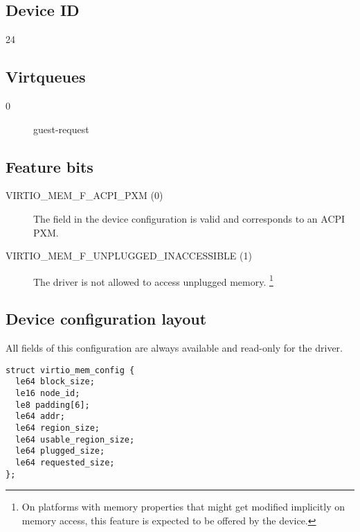 \subsection{Device ID}\label{sec:Device Types / Memory Device / Device ID}
24

\subsection{Virtqueues}\label{sec:Device Types / Memory Device / Virtqueues}

\begin{description}
\item[0] guest-request
\end{description}

\subsection{Feature bits}\label{sec:Device Types / Memory Device / Feature bits}

\begin{description}
\item[VIRTIO_MEM_F_ACPI_PXM (0)] The field  in the device
configuration is valid and corresponds to an ACPI PXM.
\item[VIRTIO_MEM_F_UNPLUGGED_INACCESSIBLE (1)] The driver is not allowed to
access unplugged memory. \footnote{On platforms with memory properties that
might get modified implicitly on memory access, this feature is expected to
be offered by the device.}
\end{description}

\subsection{Device configuration layout}\label{sec:Device Types / Memory Device / Device configuration layout}

All fields of this configuration are always available and read-only for the
driver.

\begin{lstlisting}
struct virtio_mem_config {
  le64 block_size;
  le16 node_id;
  le8 padding[6];
  le64 addr;
  le64 region_size;
  le64 usable_region_size;
  le64 plugged_size;
  le64 requested_size;
};
\end{lstlisting}

